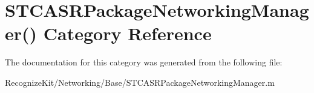 \hypertarget{category_s_t_c_a_s_r_package_networking_manager_07_08}{}\section{S\+T\+C\+A\+S\+R\+Package\+Networking\+Manager() Category Reference}
\label{category_s_t_c_a_s_r_package_networking_manager_07_08}


The documentation for this category was generated from the following file\+:\begin{DoxyCompactItemize}
\item 
Recognize\+Kit/\+Networking/\+Base/S\+T\+C\+A\+S\+R\+Package\+Networking\+Manager.\+m\end{DoxyCompactItemize}
